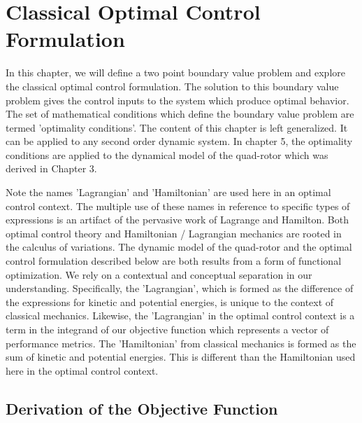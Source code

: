 
\chapter{Classical Optimal Control Formulation} %

\label{Chapter4} %


In this chapter, we will define a two point boundary value problem and explore the classical optimal control formulation. The solution to this boundary value problem gives the control inputs to the system which produce optimal behavior. The set of mathematical conditions which define the boundary value problem are termed 'optimality conditions'. The content of this chapter is left generalized. It can be applied to any second order dynamic system. In chapter 5, the optimality conditions are applied to the dynamical model of the quad-rotor which was derived in Chapter 3.

Note the names 'Lagrangian' and 'Hamiltonian' are used here in an optimal control context. The multiple use of these names in reference to specific types of expressions is an artifact of the pervasive work of Lagrange and Hamilton. Both optimal control theory and Hamiltonian / Lagrangian mechanics are rooted in the calculus of variations. The dynamic model of the quad-rotor and the optimal control formulation described below are both results from a form of functional optimization. We rely on a contextual and conceptual separation in our understanding. Specifically, the 'Lagrangian', which is formed as the difference of the expressions for kinetic and potential energies, is unique to the context of classical mechanics. Likewise, the 'Lagrangian' in the optimal control context is a term in the integrand of our objective function which represents a vector of performance metrics. The 'Hamiltonian' from classical mechanics is formed as the sum of kinetic and potential energies. This is different than the Hamiltonian used here in the optimal control context.



\section{Derivation of the Objective Function}

